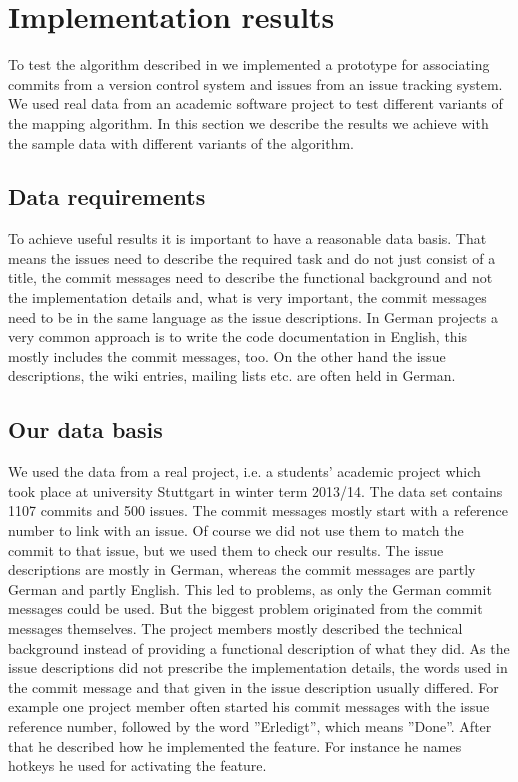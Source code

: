 \section{Implementation results}
\label{sec:implementation_results}
To test the algorithm described in  we implemented a prototype for associating commits from a version control system and issues from an issue tracking system.
We used real data from an academic software project to test different variants of the mapping algorithm.
In this section we describe the results we achieve with the sample data with different variants of the algorithm.

\subsection{Data requirements}
To achieve useful results it is important to have a reasonable data basis.
That means the issues need to describe the required task and do not just consist of a title, the commit messages need to describe the functional background and not the implementation details and, what is very important, the commit messages need to be in the same language as the issue descriptions.
In German projects a very common approach is to write the code documentation in English, this mostly includes the commit messages, too.
On the other hand the issue descriptions, the wiki entries, mailing lists etc. are often held in German.

\subsection{Our data basis}
We used the data from a real project, i.e. a students' academic project which took place at university Stuttgart in winter term 2013/14.
The data set contains 1107 commits and 500 issues.
The commit messages mostly start with a reference number to link with an issue.
Of course we did not use them to match the commit to that issue, but we used them to check our results.
The issue descriptions are mostly in German, whereas the commit messages are partly German and partly English.
This led to problems, as only the German commit messages could be used.
But the biggest problem originated from the commit messages themselves.
The project members mostly described the technical background instead of providing a functional description of what they did.
As the issue descriptions did not prescribe the implementation details, the words used in the commit message and that given in the issue description usually differed.
For example one project member often started his commit messages with the issue reference number, followed by the word ''Erledigt'', which means ''Done''.
After that he described how he implemented the feature.
For instance he names hotkeys he used for activating the feature.
